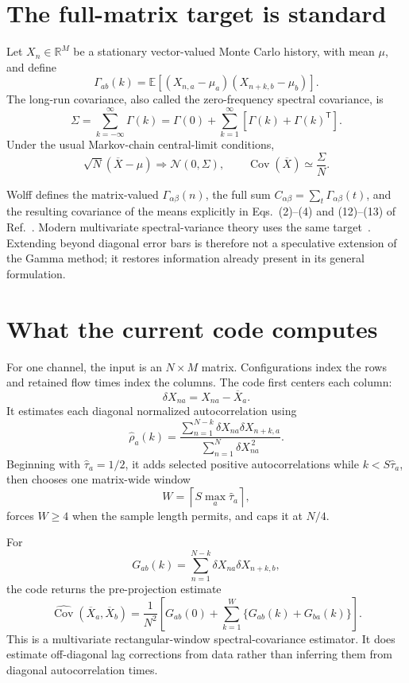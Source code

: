\documentclass[11pt]{article}
\newcommand{\Cov}{\operatorname{Cov}}
\begin{document}
\section{The full-matrix target is standard}

Let \(X_n\in\mathbb R^M\) be a stationary vector-valued Monte Carlo history,
with mean \(\mu\), and define
\[
  \Gamma_{ab}(k)
  =
  \mathbb E\left[(X_{n,a}-\mu_a)(X_{n+k,b}-\mu_b)\right].
\]
The long-run covariance, also called the zero-frequency spectral covariance,
is
\[
  \Sigma
  =
  \sum_{k=-\infty}^{\infty}\Gamma(k)
  =
  \Gamma(0)+
  \sum_{k=1}^{\infty}\left[\Gamma(k)+\Gamma(k)^{\mathsf T}\right].
\]
Under the usual Markov-chain central-limit conditions,
\[
  \sqrt N(\overline X-\mu)
  \Longrightarrow
  \mathcal N(0,\Sigma),
  \qquad
  \Cov(\overline X)\simeq\frac{\Sigma}{N}.
\]

Wolff defines the matrix-valued \(\Gamma_{\alpha\beta}(n)\), the full sum
\(C_{\alpha\beta}=\sum_t\Gamma_{\alpha\beta}(t)\), and the resulting
covariance of the means explicitly in Eqs.~(2)--(4) and (12)--(13) of
Ref.~\cite{Wolff2004}. Modern multivariate spectral-variance theory uses the
same target~\cite{VatsFlegalJones2018}. Extending beyond diagonal error bars
is therefore not a speculative extension of the Gamma method; it restores
information already present in its general formulation.

\section{What the current code computes}

For one channel, the input is an \(N\times M\) matrix. Configurations index
the rows and retained flow times index the columns. The code first centers
each column:
\[
  \delta X_{na}=X_{na}-\overline X_a.
\]
It estimates each diagonal normalized autocorrelation using
\[
  \widehat\rho_a(k)
  =
  \frac{\sum_{n=1}^{N-k}\delta X_{na}\delta X_{n+k,a}}
       {\sum_{n=1}^{N}\delta X_{na}^{\,2}}.
\]
Beginning with \(\widehat\tau_a=1/2\), it adds selected positive
autocorrelations while \(k<S\widehat\tau_a\), then chooses one matrix-wide
window
\[
  W=\left\lceil S\max_a\widehat\tau_a\right\rceil,
\]
forces \(W\geq4\) when the sample length permits, and caps it at \(N/4\).

For
\[
  G_{ab}(k)=\sum_{n=1}^{N-k}\delta X_{na}\delta X_{n+k,b},
\]
the code returns the pre-projection estimate
\[
  \boxed{
  \widehat{\Cov}(\overline X_a,\overline X_b)
  =
  \frac{1}{N^2}\left[
    G_{ab}(0)+\sum_{k=1}^{W}\{G_{ab}(k)+G_{ba}(k)\}
  \right].
  }
\]
This is a multivariate rectangular-window spectral-covariance estimator. It
does estimate off-diagonal lag corrections from data rather than inferring
them from diagonal autocorrelation times.
\end{document}
